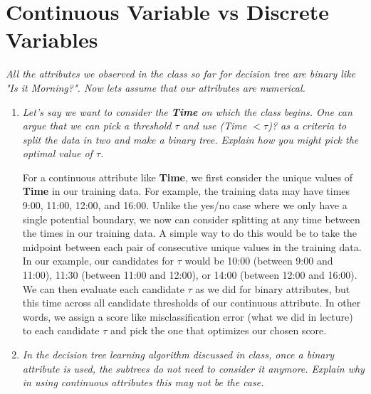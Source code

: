 \documentclass[fleqn]{article}
\begin{document}
\section{Continuous Variable vs Discrete Variables}
\textit{All the attributes we observed in the class so far for decision tree are binary like "Is it Morning?". Now lets assume that our attributes are numerical.}
\begin{enumerate}
	\item \textit{Let's say we want to consider the \textbf{Time} on which the class begins. One can argue that we can pick a threshold $\tau$ and use (Time $< \tau$)? as a criteria to split the data in two and make a binary tree. Explain how you might pick the optimal value of $\tau$.}

	      For a continuous attribute like \textbf{Time}, we first consider the unique values of \textbf{Time} in our training data.
	      For example, the training data may have times 9:00, 11:00, 12:00, and 16:00.
	      Unlike the yes/no case where we only have a single potential boundary, we now can consider splitting at any time between the times in our training data.
	      A simple way to do this would be to take the midpoint between each pair of consecutive unique values in the training data.
	      In our example, our candidates for $\tau$ would be 10:00 (between 9:00 and 11:00), 11:30 (between 11:00 and 12:00), or 14:00 (between 12:00 and 16:00).
	      We can then evaluate each candidate $\tau$ as we did for binary attributes, but this time across all candidate thresholds of our continuous attribute.
	      In other words, we assign a score like misclassification error (what we did in lecture) to each candidate $\tau$ and pick the one that optimizes our chosen score.

	\item \textit{In the decision tree learning algorithm discussed in class, once a binary attribute is used, the subtrees do not need to consider it anymore. Explain why in using continuous attributes this may not be the case.}


\end{enumerate}
\end{document}
